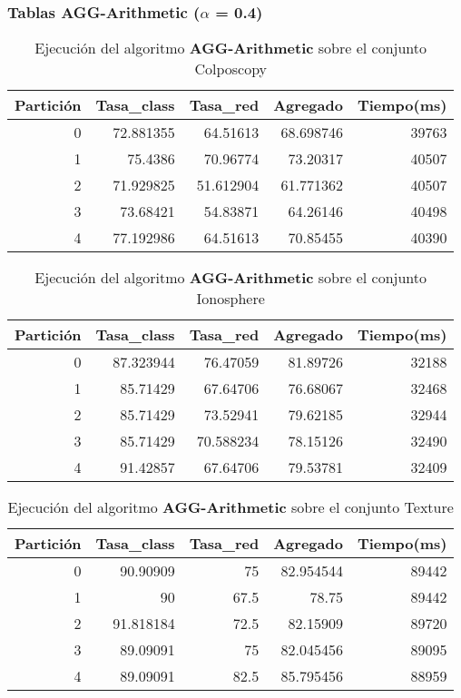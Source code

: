 \documentclass[size=a4, parskip=half, titlepage=false, toc=flat, toc=bib, 12pt]{scrartcl}
\begin{document}
\newpage

\subsubsection{Tablas AGG-Arithmetic ($\alpha$ = 0.4)}

 \begin{table}[ht]
  \centering
  \begin{tabular}[t]{rrrrr}
  \toprule
  Partición &Tasa\_class &Tasa\_red & Agregado & Tiempo(ms)\\
  \midrule
0         & 72.881355 & 64.51613  & 68.698746 & 39763  \\
1         & 75.4386   & 70.96774  & 73.20317  & 40507  \\
2         & 71.929825 & 51.612904 & 61.771362 & 40507  \\
3         & 73.68421  & 54.83871  & 64.26146  & 40498  \\
4         & 77.192986 & 64.51613  & 70.85455  & 40390  \\
  \bottomrule
  \end{tabular}
  \caption{Ejecución del algoritmo \textbf{AGG-Arithmetic} sobre el conjunto Colposcopy }
  \end{table}%

 \begin{table}[ht]
  \centering
  \begin{tabular}[t]{rrrrr}
  \toprule
  Partición &Tasa\_class &Tasa\_red & Agregado & Tiempo(ms)\\
  \midrule
0         & 87.323944 & 76.47059  & 81.89726 & 32188  \\
1         & 85.71429  & 67.64706  & 76.68067 & 32468  \\
2         & 85.71429  & 73.52941  & 79.62185 & 32944  \\
3         & 85.71429  & 70.588234 & 78.15126 & 32490  \\
4         & 91.42857  & 67.64706  & 79.53781 & 32409  \\
  \bottomrule
  \end{tabular}
  \caption{Ejecución del algoritmo \textbf{AGG-Arithmetic} sobre el conjunto Ionosphere}
  \end{table}%

 \begin{table}[ht]
  \centering
  \begin{tabular}[t]{rrrrr}
  \toprule
  Partición &Tasa\_class &Tasa\_red & Agregado & Tiempo(ms)\\
  \midrule
0         & 90.90909  & 75       & 82.954544 & 89442  \\
1         & 90        & 67.5     & 78.75     & 89442  \\
2         & 91.818184 & 72.5     & 82.15909  & 89720  \\
3         & 89.09091  & 75       & 82.045456 & 89095  \\
4         & 89.09091  & 82.5     & 85.795456 & 88959  \\
\bottomrule
  \end{tabular}
  \caption{Ejecución del algoritmo \textbf{AGG-Arithmetic} sobre el conjunto Texture}
  \end{table}%
\end{document}
